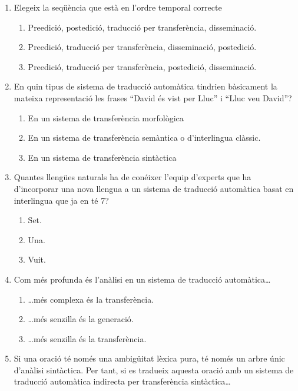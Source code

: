 \begin{enumerate}
\item Elegeix la seqüència que està en l'ordre temporal correcte
   
\begin{enumerate}
\item Preedició, postedició, traducció per transferència, disseminació.
\item Preedició, traducció per transferència, disseminació, postedició.
\item Preedició, traducció per transferència, postedició, disseminació.
\end{enumerate}
\item En quin tipus de sistema de traducció automàtica tindrien
bàsicament la mateixa representació les frases ``David és vist per
Lluc'' i ``Lluc veu David''?
   
\begin{enumerate}
\item En un sistema de transferència morfològica
\item En un sistema de transferència semàntica o d'interlingua clàssic.
\item En un sistema de transferència sintàctica
\end{enumerate}
\item Quantes llengües naturals ha de conéixer l'equip d'experts
   que ha d'incorporar una nova llengua a un sistema de traducció
   automàtica basat en interlingua que ja en té 7?
   
\begin{enumerate}
\item Set.
\item Una.
\item Vuit.
\end{enumerate}
\item Com més profunda és l'anàlisi en un sistema de traducció
   automàtica{\ldots}
   
\begin{enumerate}
\item {\ldots}més complexa és la transferència.
\item {\ldots}més senzilla és la generació.
\item {\ldots}més senzilla és la transferència.
\end{enumerate}
\item Si una oració té només una ambigüitat lèxica pura, té només
   un arbre únic d'anàlisi sintàctica. Per tant, si es tradueix
   aquesta oració amb un sistema de traducció automàtica indirecta per
   transferència sintàctica{\ldots}
   

\end{enumerate}
